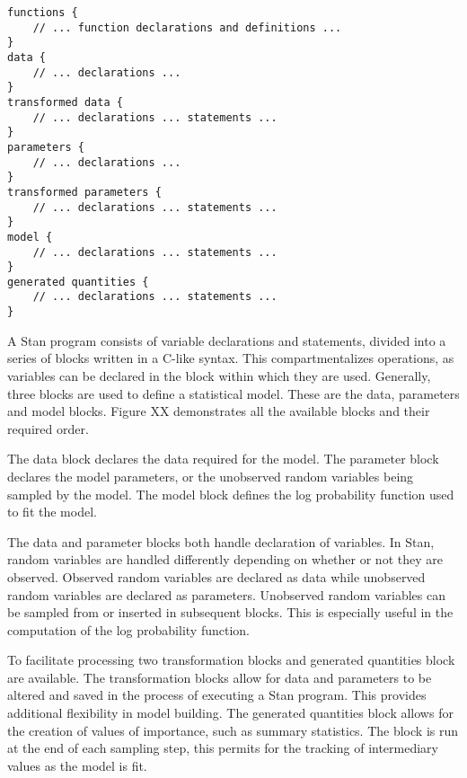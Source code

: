 \begin{lstlisting}
functions {
	// ... function declarations and definitions ...
}
data {
	// ... declarations ...
}
transformed data {
	// ... declarations ... statements ...
}
parameters {
	// ... declarations ...
}
transformed parameters {
	// ... declarations ... statements ...
}
model {
	// ... declarations ... statements ...
}
generated quantities {
	// ... declarations ... statements ...
}
\end{lstlisting}


A Stan program consists of variable declarations and statements, divided into a series of blocks written in a C-like syntax. This compartmentalizes operations, as variables can be declared in the block within which they are used. Generally, three blocks are used to define a statistical model. These are the data, parameters and model blocks. Figure XX demonstrates all the available blocks and their required order.

The data block declares the data required for the model. The parameter block declares the model parameters, or the unobserved random variables being sampled by the model. The model block defines the log probability function used to fit the model. 

The data and parameter blocks both handle declaration of variables. In Stan, random variables are handled differently depending on whether or not they are observed. Observed random variables are declared as data while unobserved random variables are declared as parameters. Unobserved random variables can be sampled from or inserted in subsequent blocks. This is especially useful in the computation of the log probability function. 

To facilitate processing two transformation blocks and generated quantities block are available. The transformation blocks allow for data and parameters to be altered and saved in the process of executing a Stan program. This provides additional flexibility in model building. The generated quantities block allows for the creation of values of importance, such as summary statistics. The block is run at the end of each sampling step, this permits for the tracking of intermediary values as the model is fit. 


